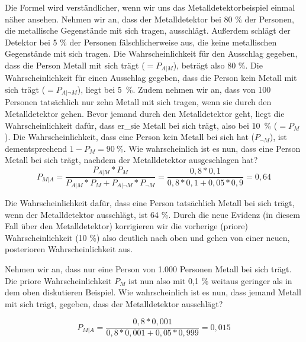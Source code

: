 Die Formel wird verständlicher, wenn wir uns das Metalldetektorbeispiel einmal näher ansehen. Nehmen wir an, dass der Metalldetektor bei 80 \% der Personen, die metallische Gegenstände mit sich tragen, ausschlägt. Außerdem schlägt der Detektor bei 5 \% der Personen fälschlicherweise aus, die keine metallischen Gegenstände mit sich tragen. Die Wahrscheinlichkeit für den Ausschlag gegeben, dass die Person Metall mit sich trägt ($= P_{A|M}$), beträgt also 80 \%. Die Wahrscheinlichkeit für einen Ausschlag gegeben, dass die Person kein Metall mit sich trägt  ($= P_{A|\neg M}$), liegt bei 5~\%. Zudem nehmen wir an, dass von 100 Personen tatsächlich nur zehn Metall mit sich tragen, wenn sie durch den Metalldetektor gehen. Bevor jemand durch den Metalldetektor geht, liegt die Wahrscheinlichkeit dafür, dass er\_sie Metall bei sich trägt, also bei 10~\% ($= P_{M}$). Die Wahrscheinlichkeit, dass eine Person kein Metall bei sich hat ($P_{\neg M}$), ist dementsprechend $1 - P_{M} = 90\ \%$. Wie wahrscheinlich ist es nun, dass eine Person Metall bei sich trägt, nachdem der Metalldetektor ausgeschlagen hat?
\[ P_{M|A} = \frac{P_{A|M}*P_{M}}{P_{A|M}*P_{M} + P_{A|\neg M}*P_{\neg M}} 
= \frac{0{,}8*0{,}1}{0{,}8*0{,}1 + 0{,}05*0{,}9} 
= 0{,}64 \]

Die Wahrscheinlichkeit dafür, dass eine Person tatsächlich Metall bei sich trägt, wenn der Metalldetektor ausschlägt, ist 64 \%. Durch die neue Evidenz (in diesem Fall über den Metalldetektor) korrigieren wir die vorherige (priore) Wahrscheinlichkeit (10 \%) also deutlich nach oben und gehen von einer neuen, posterioren Wahrscheinlichkeit aus.

Nehmen wir an, dass nur eine Person von 1.000 Personen Metall bei sich trägt. Die priore Wahrscheinlichkeit $P_{M}$ ist nun also mit 0,1 \% weitaus geringer als in dem oben diskutieren Beispiel. Wie wahrscheinlich ist es nun, dass jemand Metall mit sich trägt, gegeben, dass der Metalldetektor ausschlägt?

\[ P_{M|A} = \frac{0{,}8*0{,}001}{0{,}8*0{,}001 + 0{,}05*0{,}999} = 0{,}015 \]

